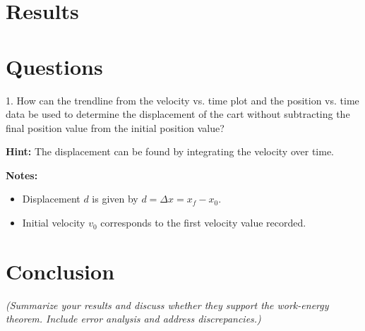 \documentclass[hidelinks, 12pt, letterpaper]{article}
\begin{document}
\section{Results}




\section{Questions}
1. How can the trendline from the velocity vs. time plot and the position vs. time data be used to determine the displacement of the cart without subtracting the final position value from the initial position value?

\textbf{Hint:} The displacement can be found by integrating the velocity over time.

\vspace{0.5cm}
\noindent\textbf{Notes:}
\begin{itemize}
    \item Displacement $d$ is given by $d = \Delta x = x_f - x_0$.
    \item Initial velocity $v_0$ corresponds to the first velocity value recorded.
\end{itemize}

\section{Conclusion}
\textit{(Summarize your results and discuss whether they support the work-energy theorem. Include error analysis and address discrepancies.)}
\end{document}
